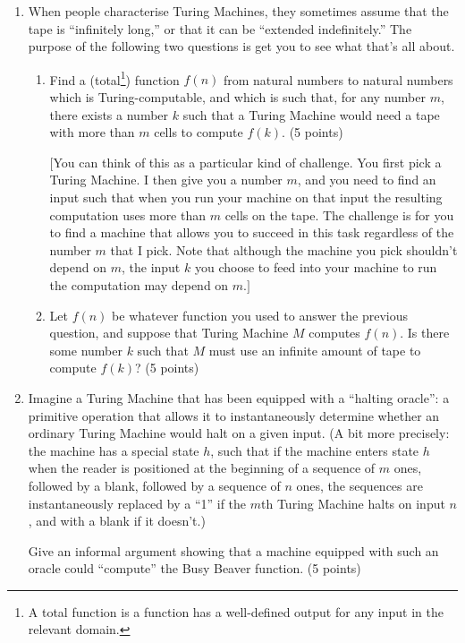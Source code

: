 \documentclass[12pt,a4paper]{article}
\begin{document}
\begin{enumerate}
\item When people characterise Turing Machines, they sometimes assume that the tape is ``infinitely long,'' or that it can be ``extended indefinitely.'' The purpose of the following two questions is get you to see what that's all about. 
\begin{enumerate}

\item Find a (total\footnote{A total function is a function has a well-defined output for any input in the relevant domain.}) function $f(n)$ from natural numbers to natural numbers which is Turing-computable, and which is such that, for any number $m$, there exists a number $k$ such that a Turing Machine would need a tape with more than $m$ cells to compute $f(k)$. (5 points)

$[$You can think of this as a particular kind of challenge. You first pick a Turing Machine. I then give you a number $m$, and you need to find an input such that when you run your machine on that input the resulting computation uses more than $m$ cells on the tape. The challenge is for you to find a machine that allows you to succeed in this task regardless of the number $m$ that I pick. Note that although the machine you pick shouldn't depend on $m$, the input $k$ you choose to feed into your machine to run the computation may depend on $m$.$]$

\item Let $f(n)$ be whatever function you used to answer the previous question, and suppose that Turing Machine $M$ computes $f(n)$. Is there some number $k$ such that $M$ must use an infinite amount of tape to compute $f(k)$? (5 points)
\end{enumerate}

\item Imagine a Turing Machine that has been equipped with a ``halting oracle'': a primitive operation that allows it to instantaneously determine whether an ordinary Turing Machine would halt on a given input. (A bit more precisely: the machine has a special state $h$, such that if the machine enters state $h$ when the reader is positioned at the beginning of a sequence of $m$ ones, followed by a blank, followed by a sequence of $n$ ones, the sequences are instantaneously replaced by a ``1'' if the $m$th Turing Machine
halts on input $n$, and with a blank if it doesn't.)

Give an informal argument showing that a machine equipped with such an oracle could ``compute'' the Busy Beaver function. (5 points)


\end{enumerate}
\end{document}
